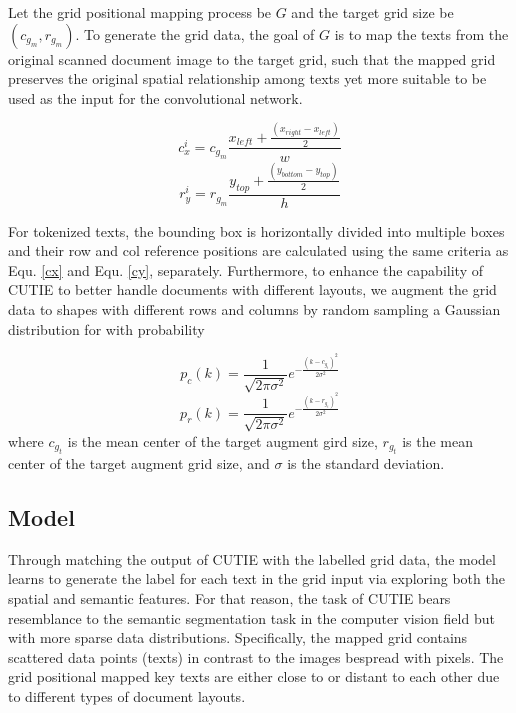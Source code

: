 \documentclass[10pt,twocolumn,letterpaper]{article}
\begin{document}
Let the grid positional mapping process be $G$ and the target grid size be $(c_{g_m}, r_{g_m})$. To generate the grid data, the goal of $G$ is to map the texts from the original scanned document image to the target grid, such that the mapped grid preserves the original spatial relationship among texts yet more suitable to be used as the input for the convolutional network. 

\begin{equation}
\label{cx}
c^i_x = c_{g_m} \frac{x_{left} + \frac{(x_{right} - x_{left})}{2}}{w}
\end{equation}
\begin{equation}
\label{cy}
r^i_y = r_{g_m} \frac{y_{top} + \frac{(y_{bottom} - y_{top})}{2}}{h}
\end{equation}

For tokenized texts, the bounding box is horizontally divided into multiple boxes and their row and col reference positions are calculated using the same criteria as Equ. \ref{cx} and Equ. \ref{cy}, separately. Furthermore, to enhance the capability of CUTIE to better handle documents with different layouts, we augment the grid data to shapes with different rows and columns by random sampling a Gaussian distribution for with probability

\begin{equation}
\label{augmentc}
p_c(k) = \frac{1}{\sqrt{2 \pi \sigma^2}} e^{- \frac{(k - c_{g_t})^2}{2 \sigma^2}}
\end{equation}
\begin{equation}
\label{augmentr}
p_r(k) = \frac{1}{\sqrt{2 \pi \sigma^2}} e^{- \frac{(k - r_{g_t})^2}{2 \sigma^2}}
\end{equation}
where $c_{g_t}$ is the mean center of the target augment gird size, $r_{g_t}$ is the mean center of the target augment grid size, and $\sigma$ is the standard deviation.


\subsection{Model}
Through matching the output of CUTIE with the labelled grid data, the model learns to generate the label for each text in the grid input via exploring both the spatial and semantic features. For that reason, the task of CUTIE bears resemblance to the semantic segmentation task in the computer vision field but with more sparse data distributions. Specifically, the mapped grid contains scattered data points (texts) in contrast to the images bespread with pixels. The grid positional mapped key texts are either close to or distant to each other due to different types of document layouts. 
\end{document}
